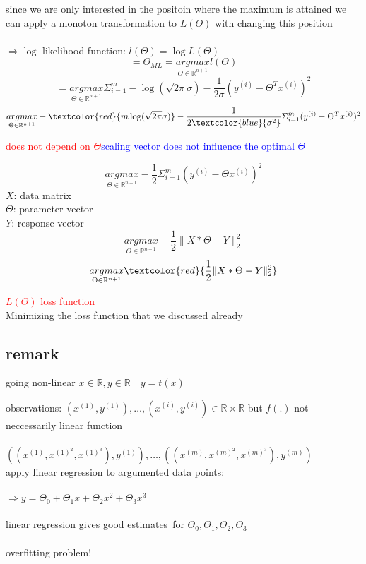 \begin{enumerate}[(1)]
since we are only interested in the positoin where the maximum is attained we can apply a monoton transformation to $L(\Theta)$ with changing this position\\\\
$\Rightarrow \log$-likelihood function: $l(\Theta) = \log L(\Theta)$
\[ = \Theta_{ML} = \underset{\Theta \in \mathbb{R}^{n+1}}{argmax} l(\Theta)\]
\[ = \underset{\Theta \in \mathbb{R}^{n+1}}{argmax} \Sigma^m_{i=1} - \log (\sqrt{2\pi}\sigma) - \frac{1}{2\sigma}(y^{(i)} - \Theta^T x^{(i)})^2\]
\[\underset{\Theta \in \mathbb{R}^{n+1}}{argmax} - \textcolor{red}{m \log (\sqrt{2\pi}\sigma)} - \frac{1}{2\textcolor{blue}{\sigma^2}}\Sigma^m_{i=1}(y^{(i)} - \Theta^T x^{(i)})^2  \]
\begin{center}
\textcolor{red}{does not depend on $\Theta$}\space\space\space \textcolor{blue}{scaling vector does not influence the optimal $\Theta$}
\end{center}
\[ \underset{\Theta \in \mathbb{R}^{n+1}}{argmax} -\frac{1}{2} \Sigma^m_{i=1}(y^{(i)}-\Theta x^{(i)})^2\]
$X$: data matrix\\
$\Theta$: parameter vector\\
$Y$: response vector
\[\underset{\Theta \in \mathbb{R}^{n+1}}{argmax} -\frac{1}{2} \lVert X * \Theta - Y \lVert^2_2\]
\[ \underset{\Theta \in \mathbb{R}^{n+1}}{argmax} \textcolor{red}{\frac{1}{2} \lVert X * \Theta - Y \lVert^2_2}\]
\begin{center}
\textcolor{red}{$L(\Theta)$ loss function}\\
Minimizing the loss function that we discussed already\\
\end{center}
\end{enumerate}
\subsection*{remark} going non-linear $x \in \mathbb{R}, y \in \mathbb{R} \quad y=t(x)$
\begin{addmargin}[2 cm]{0 cm}
observations: $(x^{(1)}, y^{(1)}), \dots ,(x^{(i)}, y^{(i)}) \in \mathbb{R} \times \mathbb{R}$ but $f(.)$ not neccessarily linear function\\\\
$((x^{(1)},x^{(1)^2}, x^{(1)^3}), y^{(1)}), \dots , ((x^{(m)},x^{(m)^2}, x^{(m)^3}), y^{(m)})$\\
apply linear regression to argumented data points:\\\\
$\Rightarrow y = \Theta_0 + \Theta_1  x + \Theta_2  x^2 + \Theta_3 x^3$\\\\
linear regression gives \glqq good estimates\grqq\ for $\Theta_0, \Theta_1, \Theta_2, \Theta_3$\\\\
overfitting problem!
\end{addmargin} 

